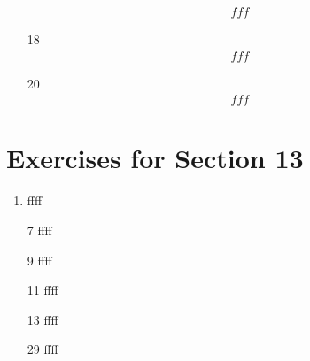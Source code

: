 \documentclass[12pt]{article}
\begin{document}
\begin{enumerate}
\begin{equation*}
\begin{split}
	    		fff
	    	\end{split}
	    \end{equation*}
	\item [18] 
	    \begin{equation*}
	    	\begin{split}
	    		fff
	    	\end{split}
	    \end{equation*}
	\item [20] 
	    \begin{equation*}
	    	\begin{split}
	    		fff
	    	\end{split}
	    \end{equation*}
\end{enumerate}
\section*{Exercises for Section 13}
\begin{enumerate}
	\item ffff
	\item [7] ffff
	\item [9] ffff
	\item [11] ffff
	\item [13] ffff
	\item [29] ffff
\end{enumerate}
\end{document}
